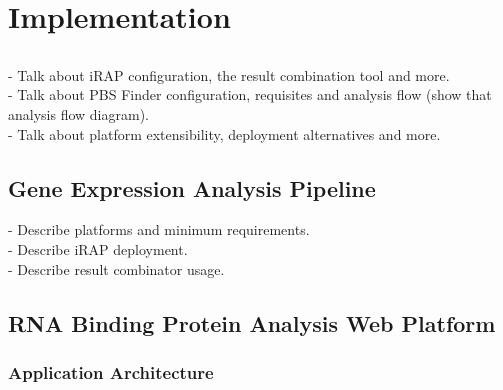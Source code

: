 \chapter{Implementation} \label{chap:implementation}

\section*{}

\begin{Notes}
- Talk about iRAP configuration, the result combination tool and more.\\
- Talk about PBS Finder configuration, requisites and analysis flow (show that analysis flow diagram).\\
- Talk about platform extensibility, deployment alternatives and more.\\
\end{Notes}

\section{Gene Expression Analysis Pipeline}

\begin{Notes}
- Describe platforms and minimum requirements.\\
- Describe iRAP deployment.\\
- Describe result combinator usage.\\
\end{Notes}

\section{RNA Binding Protein Analysis Web Platform}

\subsection{Application Architecture}


